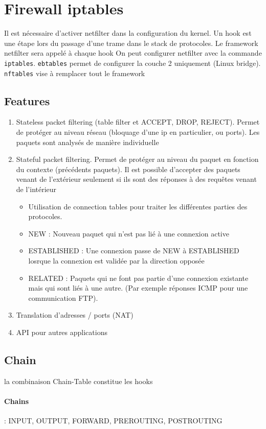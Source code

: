 \section{Firewall iptables}
Il est nécessaire d'activer netfilter dans la configuration du kernel. Un hook est une étape lors du passage d'une trame dans le stack de protocoles. Le framework netfilter sera appelé à chaque hook
On peut configurer netfilter avec la commande \verb!iptables!. \verb!ebtables! permet de configurer la couche 2 uniquement (Linux bridge). \verb!nftables! vise à remplacer tout le framework

\subsection{Features}
\begin{enumerate}
\item Stateless packet filtering (table filter et ACCEPT, DROP, REJECT). Permet de protéger au niveau réseau (bloquage d'une ip en particulier, ou ports). Les paquets sont analysés de manière individuelle
\item Stateful packet filtering. Permet de protéger au niveau du paquet en fonction du contexte (précédents paquets). Il est possible d'accepter des paquets venant de l'extérieur seulement si ils sont des réponses à des requêtes venant de l'intérieur
\begin{itemize}
\item Utilisation de connection tables pour traiter les différentes parties des protocoles.
\item NEW : Nouveau paquet qui n'est pas lié à une connexion active
\item ESTABLISHED : Une connexion passe de NEW à ESTABLISHED losrque la connexion est validée par la direction opposée
\item RELATED : Paquets qui ne font pas partie d'une connexion existante mais qui sont liés à une autre. (Par exemple réponses ICMP pour une communication FTP).
\end{itemize}
\item Translation d'adresses / ports (NAT)
\item API pour autres applications
\end{enumerate}
\subsection{Chain}
la combinaison Chain-Table constitue les hooks
\paragraph{Chains} : INPUT, OUTPUT, FORWARD, PREROUTING, POSTROUTING
